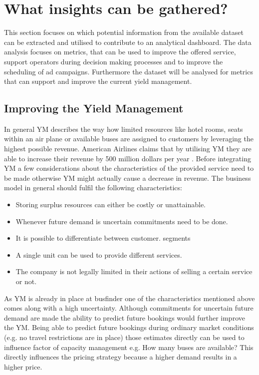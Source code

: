 %
%
% 
% 
% 


\chapter{What insights can be gathered?}
\label{chap:insights}
This section focuses on which potential information from the available dataset can be extracted and utilised to contribute to an analytical dashboard. The data analysis focuses on metrics, that can be used to improve the offered service, support operators during decision making processes and to improve the scheduling of ad campaigns. Furthermore the dataset will be analysed for metrics that can support and improve the current yield management. 


\section{Improving the Yield Management}
In general YM describes the way how limited resources like hotel rooms, seats within an air plane or available buses are assigned to customers by leveraging the highest possible revenue. American Airlines claims that by utilising YM they are able to increase their revenue by 500 million dollars per year \cite{ym_practice}. Before integrating YM a few considerations about the characteristics of the provided service need to be made otherwise YM might actually cause a decrease in revenue. The business model in general should fulfil the following characteristics:\cite{ym_practice}
\begin{itemize}
  \item Storing surplus resources can either be costly or unattainable. 
  \item Whenever future demand is uncertain commitments need to be done.
  \item It is possible to differentiate between customer. segments
  \item A single unit can be used to provide different services. 
  \item The company is not legally limited in their actions of selling a certain service or not.
\end{itemize}
As YM is already in place at busfinder one of the characteristics mentioned above comes along with a high uncertainty. Although commitments for uncertain future demand are made the ability to predict future bookings would further improve the YM. Being able to predict future bookings during ordinary market conditions (e.g. no travel restrictions are in place) those estimates directly can be used to influence factor of capacity management e.g. How many buses are available? This directly influences the pricing strategy because a higher demand results in a higher price.

